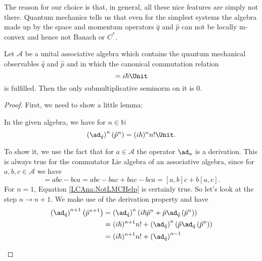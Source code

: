 The reason for our choice is that, in general, all these nice features are 
simply not there. Quantum mechanics tells us that even for the simplest systems 
the algebra made up by the space and momentum operators $\hat{q}$ and $\hat{p}$ 
can not be locally m-convex and hence not Banach or $C^*$.
\begin{proposition}
	\label{Prop:LCAna:QMnotLMC}
	Let $\mathcal{A}$ be a unital associative algebra which contains the 
	quantum mechanical observables $\hat{q}$ and $\hat{p}$ and in which 
	the canonical commutation relation
	\begin{equation*}
		[\hat{q}, \hat{p}]
		=
		i \hbar \Unit
	\end{equation*}
	is fulfilled. Then the only submultiplicative seminorm on it is 0.
\end{proposition}
\begin{proof}
	First, we need to show a little lemma:
	\begin{lemma}
		\label{Lemma:LCAna:NotLMCHelp}
		In the given algebra, we have for $n \in \mathbb{N}$
		\begin{equation}
			\label{LCAna:NotLMCHelp}
			\left( \ad_{\hat{q}} \right)^n (\hat{p}^n)
			=
			(i \hbar)^n n! \Unit.
		\end{equation}
	\end{lemma}
	\begin{subproof}
		To show it, we use the fact that for $a \in \mathcal{A}$ the 
		operator $\ad_a$ is a derivation. This is always true for the 
		commutator Lie algebra of an associative algebra, since for 
		$a, b, c \in \mathcal{A}$ we have
		\begin{equation*}
			[a, bc]
			=
			a b c - b c a
			=
			a b c - b a c + b a c - b c a
			=
			[a, b] c + b [a, c].
		\end{equation*}
		For $n = 1$, Equation \eqref{LCAna:NotLMCHelp} is 
		certainly true. So let's look at the step $n \rightarrow n+1$.
		We make use of the derivation property and have
		\begin{align*}
			\left( \ad_{\hat{q}} \right)^{n+1}
			\left( \hat{p}^{n+1} \right)
			& =
			\left( \ad_{\hat{q}} \right)^{n}
			\left(
				i \hbar \hat{p}^n
				+
				\hat{p} 
				\ad_{\hat{q}} \left( \hat{p}^n \right)
			\right)
			\\
			& =
			(i \hbar)^{n + 1} n!
			+
			\left( \ad_{\hat{q}} \right)^{n}
			\left(
				\hat{p}
				\ad_{\hat{q}} \left( \hat{p}^n \right)
			\right)
			\\
			& =
			(i \hbar)^{n + 1} n!
			+
			\left( \ad_{\hat{q}} \right)^{n-1}

\end{align*}
\end{subproof}
\end{proof}
